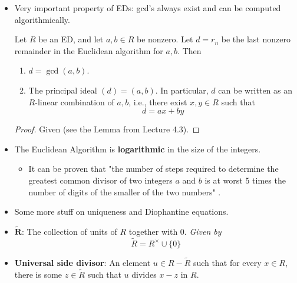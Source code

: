 \documentclass[../notes.tex]{subfiles}
\begin{document}
\begin{itemize}
\begin{proposition}
\begin{proof}
            Therefore, $x,y$ are both units and we have the desired result.\par
            If $d,d'$ are both gcd's of $a,b$, then $(d)=(d')$. Thus, apply the first statement to obtain the desired result.
        \end{proof}
    \end{proposition}
    \item Very important property of EDs: gcd's always exist and can be computed algorithmically.
    \begin{theorem}\label{trm:8.4}
        Let $R$ be an ED, and let $a,b\in R$ be nonzero. Let $d=r_n$ be the last nonzero remainder in the Euclidean algorithm for $a,b$. Then
        \begin{enumerate}
            \item $d=\gcd(a,b)$.
            \item The principal ideal $(d)=(a,b)$. In particular, $d$ can be written as an $R$-linear combination of $a,b$, i.e., there exist $x,y\in R$ such that
            \begin{equation*}
                d = ax+by
            \end{equation*}
        \end{enumerate}
        \begin{proof}
            Given (see the Lemma from Lecture 4.3).
        \end{proof}
    \end{theorem}
    \item The Euclidean Algorithm is \textbf{logarithmic} in the size of the integers.
    \begin{itemize}
        \item It can be proven that "the number of steps required to determine the greatest common divisor of two integers $a$ and $b$ is at worst 5 times the number of digits of the smaller of the two numbers" \parencite[276]{bib:DummitFoote}.
    \end{itemize}
    \item Some more stuff on uniqueness and Diophantine equations.
    \item $\bm{\widetilde{R}}$: The collection of units of $R$ together with 0. \emph{Given by}
    \begin{equation*}
        \widetilde{R} = R^\times\cup\{0\}
    \end{equation*}
    \item \textbf{Universal side divisor}: An element $u\in R-\widetilde{R}$ such that for every $x\in R$, there is some $z\in\widetilde{R}$ such that $u$ divides $x-z$ in $R$.

\end{itemize}
\end{document}
